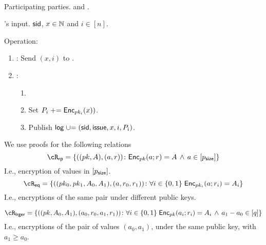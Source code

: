 \begin{protocol}~\label{prot:ConfidentialTransactions:Issue}
	\item[Participating parties.] \Ic and \Cc.
	
	
	\item[\Cc's input.] $\mathsf{sid}$, $x\in {\mathbb{N}}$ and $i\in [n]$.
	
	\item[Operation:] ~
	
	
	\begin{enumerate}
		
		\item   \Ic: Send $(x,i)$ to \Cc.
		
		\item \Cc:  
		\begin{enumerate}
			\item {}
			
			\item Set $P_i \mathrel{+}= \mathsf{Enc}_{pk_i}(x))$.
				
		\item Publish $\mathsf{log} \mathrel{\cup}= (\mathsf{sid},\mathsf{issue},x,i,P_i)$.
				 	
		\end{enumerate}
		
	\end{enumerate}
\end{protocol}


\newcommand{\RPs}{{\sf rp}}
\newcommand{\rRP}{\cR_\RPs}

\newcommand{\rRPDef}
{
	\set{((pk,A),(a,r))\colon \Enc_{pk}(a;r)= A \sland a\in [\psize]}
}


\newcommand{\Eqs}{{\sf eq}}
\newcommand{\rEQ}{\cR_\Eqs}

\newcommand{\rEQDef}
{
	\set{((pk_0,pk_1,A_0,A_1),(a,r_0,r_1))\colon \forall i\in \zo \; \Enc_{pk_i}(a;r_i)= A_i}
}

\newcommand{\Lrgs}{{\sf lrger}}
\newcommand{\rLrg}{\cR_\Lrgs}

\newcommand{\rLrgDef}
{
	\set{((pk,A_0,A_1),(a_0,r_0,a_1,r_1))\colon \forall i\in \zo \; \Enc_{pk}(a_i;r_i)= A_i \sland a_1 -a_0 \in [q]} 
}

We use proofs for the   following  relations  
$$\rRP =\rRPDef$$
I.e., encryption of values in $[p_{\mathsf{size}}]$.
$$\rEQ =\rEQDef$$
I.e., encryptions of the same pair under different public keys.


$$\rLrg =\rLrgDef$$
I.e., encryptions of the  pair of values $(a_0,a_1)$, under the same public key, with $a_1 \ge a_0$.

